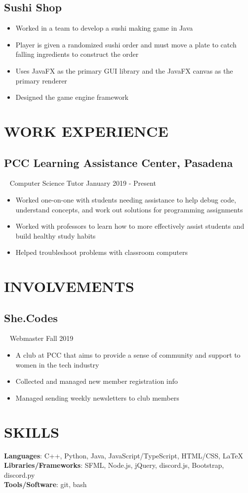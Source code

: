 \documentclass{article}
\begin{document}
\subsection*{Sushi Shop}
\begin{itemize}
    \item Worked in a team to develop a sushi making game in Java
    \item Player is given a randomized sushi order and must move a plate to catch falling ingredients to construct the order
    \item Uses JavaFX as the primary GUI library and the JavaFX canvas as the primary renderer 
    \item Designed the game engine framework
\end{itemize}

\section*{\textcolor{wordblue}{WORK EXPERIENCE}}
\subsection*{PCC Learning Assistance Center, Pasadena}
\ 
\footnotesize
\textcolor{wordgrey}{Computer Science Tutor}
\normalsize
\hfill
\textcolor{wordgrey}{January 2019 - Present}
\begin{itemize}
    \item Worked one-on-one with students needing assistance to help debug code, understand concepts, and work out solutions for programming assignments
    \item Worked with professors to learn how to more effectively assist students and build healthy study habits
    \item Helped troubleshoot problems with classroom computers
\end{itemize}
\section*{\textcolor{wordblue}{INVOLVEMENTS}}
\subsection*{She.Codes}
\ 
\footnotesize
\textcolor{wordgrey}{Webmaster}
\normalsize
\hfill
\textcolor{wordgrey}{Fall 2019}
\begin{itemize}
    \item A club at PCC that aims to provide a sense of community and support to women in the tech industry
    \item Collected and managed new member registration info
    \item Managed sending weekly newsletters to club members    
\end{itemize}
\section*{\textcolor{wordblue}{SKILLS}}
\textbf{Languages}: C++, Python, Java, JavaScript/TypeScript, HTML/CSS, {\selectfont\LaTeX}\\
\textbf{Libraries/Frameworks}: SFML, Node.js, jQuery, discord.js, Bootstrap, discord.py\\
\textbf{Tools/Software}: git, bash
\end{document}
